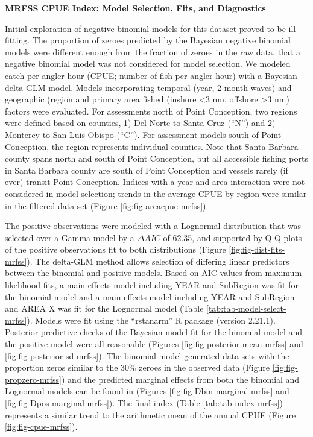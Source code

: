 \documentclass[11pt,
  english,
]{article}
\begin{document}
\textbf{MRFSS CPUE Index: Model Selection, Fits, and Diagnostics}

Initial exploration of negative binomial models for this dataset proved to be ill-fitting. The proportion of zeroes predicted by the Bayesian negative binomial models were different enough from the fraction of zeroes in the raw data, that a negative binomial model was not considered for model selection. We modeled catch per angler hour (CPUE; number of fish per angler hour) with a Bayesian delta-GLM model. Models incorporating temporal (year, 2-month waves) and geographic (region and primary area fished (inshore \textless3 nm, offshore \textgreater3 nm) factors were evaluated. For assessments north of Point Conception, two regions were defined based on counties, 1) Del Norte to Santa Cruz (``N'') and 2) Monterey to San Luis Obispo (``C''). For assessment models south of Point Conception, the region represents individual counties. Note that Santa Barbara county spans north and south of Point Conception, but all accessible fishing ports in Santa Barbara county are south of Point Conception and vessels rarely (if ever) transit Point Conception. Indices with a year and area interaction were not considered in model selection; trends in the average CPUE by region were similar in the filtered data set (Figure \ref{fig:fig-areacpue-mrfss}).

The positive observations were modeled with a Lognormal distribution that was selected over a Gamma model by a {\(\Delta AIC\)\leavevmode\tagmcend\tagstructend} of 62.35, and supported by Q-Q plots of the positive observations fit to both distributions (Figure \ref{fig:fig-dist-fits-mrfss}). The delta-GLM method allows selection of differing linear predictors between the binomial and positive models. Based on AIC values from maximum likelihood fits, a main effects model including YEAR and SubRegion was fit for the binomial model and a main effects model including YEAR and SubRegion and AREA X was fit for the Lognormal model (Table \ref{tab:tab-model-select-mrfss}). Models were fit using the ``rstanarm'' R package (version 2.21.1). Posterior predictive checks of the Bayesian model fit for the binomial model and the positive model were all reasonable (Figures \ref{fig:fig-posterior-mean-mrfss} and \ref{fig:fig-posterior-sd-mrfss}). The binomial model generated data sets with the proportion zeros similar to the 30\% zeroes in the observed data (Figure \ref{fig:fig-propzero-mrfss}) and the predicted marginal effects from both the binomial and Lognormal models can be found in (Figures \ref{fig:fig-Dbin-marginal-mrfss} and \ref{fig:fig-Dpos-marginal-mrfss}). The final index (Table \ref{tab:tab-index-mrfss}) represents a similar trend to the arithmetic mean of the annual CPUE (Figure \ref{fig:fig-cpue-mrfss}).
\end{document}

